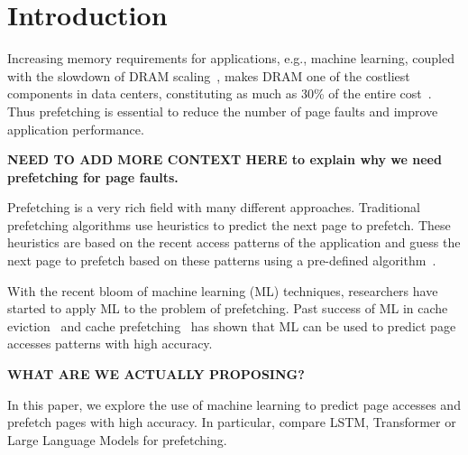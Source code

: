 \section{Introduction}
Increasing memory requirements for applications, e.g., machine learning, coupled with the slowdown of DRAM scaling~\cite{dram-1, dram-2}, makes DRAM one of the costliest components in data centers, constituting as much as 30\% of the entire cost~\cite{meta}. Thus prefetching is essential to reduce the number of page faults and improve application performance.

\textbf{NEED TO ADD MORE CONTEXT HERE to explain why we need prefetching for page faults.}




Prefetching is a very rich field with many different approaches. Traditional prefetching algorithms use heuristics to predict the next page to prefetch. These heuristics are based on the recent access patterns of the application and guess the next page to prefetch based on these patterns using a pre-defined algorithm~\cite{Markov, Survey}. 


With the recent bloom of machine learning (ML) techniques, researchers have started to apply ML to the problem of prefetching. Past success of ML in cache eviction~\cite{RelaxedBelady} and cache prefetching~\cite{LMAP,Twilight,canvas} has shown that ML can be used to predict page accesses patterns with high accuracy.

\textbf{WHAT ARE WE ACTUALLY PROPOSING?}

In this paper, we explore the use of machine learning to predict page accesses and prefetch pages with high accuracy. In particular, compare LSTM, Transformer or Large Language Models for prefetching.